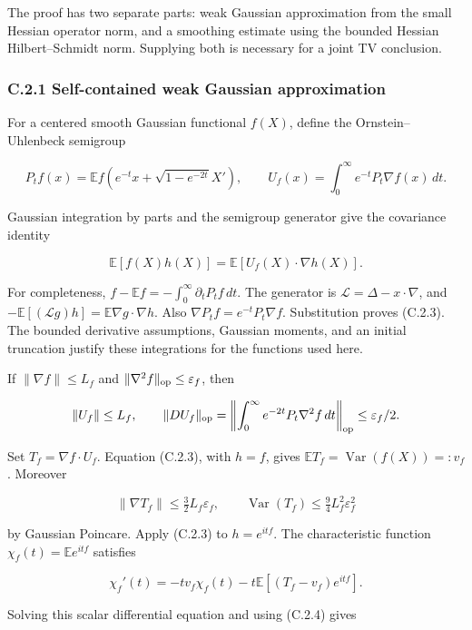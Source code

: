 \documentclass[
  11pt,
  a4paper,
]{article}
\begin{document}
The proof has two separate parts: weak Gaussian approximation from the
small Hessian operator norm, and a smoothing estimate using the bounded
Hessian Hilbert--Schmidt norm. Supplying both is necessary for a joint
TV conclusion.

\hypertarget{c.2.1-self-contained-weak-gaussian-approximation}{%
\subsubsection{C.2.1 Self-contained weak Gaussian
approximation}\label{c.2.1-self-contained-weak-gaussian-approximation}}

For a centered smooth Gaussian functional \(f(X)\), define the
Ornstein--Uhlenbeck semigroup

\[
P_tf(x)=\mathbb E f(e^{-t}x+\sqrt{1-e^{-2t}}X'),
\qquad
U_f(x)=\int_0^\infty e^{-t}P_t\nabla f(x)\,dt.
\]

Gaussian integration by parts and the semigroup generator give the
covariance identity

\[
\mathbb E[f(X)h(X)]
 =\mathbb E[U_f(X)\cdot\nabla h(X)].
\tag{C.2.3}
\]

For completeness, \(f-\mathbb Ef=-\int_0^\infty\partial_tP_tf\,dt\). The
generator is \(\mathcal L=\Delta-x\cdot\nabla\), and
\(-\mathbb E[(\mathcal Lg)h]=\mathbb E\nabla g\cdot\nabla h\). Also
\(\nabla P_tf=e^{-t}P_t\nabla f\). Substitution proves (C.2.3). The
bounded derivative assumptions, Gaussian moments, and an initial
truncation justify these integrations for the functions used here.

If \(\|\nabla f\|\le L_f\) and
\(\|\nabla^2f\|_{\rm op}\le\varepsilon_f\), then

\[
\|U_f\|\le L_f,\qquad
\|DU_f\|_{\rm op}
 =\left\|\int_0^\infty e^{-2t}P_t\nabla^2f\,dt\right\|_{\rm op}
 \le\varepsilon_f/2.
\]

Set \(T_f=\nabla f\cdot U_f\). Equation (C.2.3), with \(h=f\), gives
\(\mathbb ET_f=\operatorname{Var}(f(X))=:v_f\). Moreover

\[
\|\nabla T_f\|
 \le\tfrac32 L_f\varepsilon_f,
\qquad
\operatorname{Var}(T_f)
 \le\tfrac94 L_f^2\varepsilon_f^2
\tag{C.2.4}
\]

by Gaussian Poincare. Apply (C.2.3) to \(h=e^{itf}\). The characteristic
function \(\chi_f(t)=\mathbb E e^{itf}\) satisfies

\[
\chi_f'(t)=-t v_f\chi_f(t)
           -t\mathbb E[(T_f-v_f)e^{itf}].
\]

Solving this scalar differential equation and using (C.2.4) gives
\end{document}
